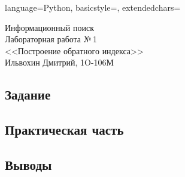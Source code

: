 \documentclass[12pt]{article}
\newcommand{\StudentName}{Ильвохин Дмитрий}
\newcommand{\Group}{1O-106М}
\newcommand{\CourseName}{Информационный поиск}
\newcommand{\LabNum}{1}
\newcommand{\Subject}{Построение обратного индекса}
\begin{document}
\lstset
{
        language=Python,
        basicstyle=\footnotesize,%
        extendedchars=\true
}

\begin{flushright}
\Large{
	\CourseName \\
	Лабораторная работа №\,\LabNum \\
	<<\Subject>> \\
  \StudentName, \Group \\
}
\end{flushright}

\subsection*{Задание}

\subsection*{Практическая часть}

\subsection*{Выводы}
\end{document}
